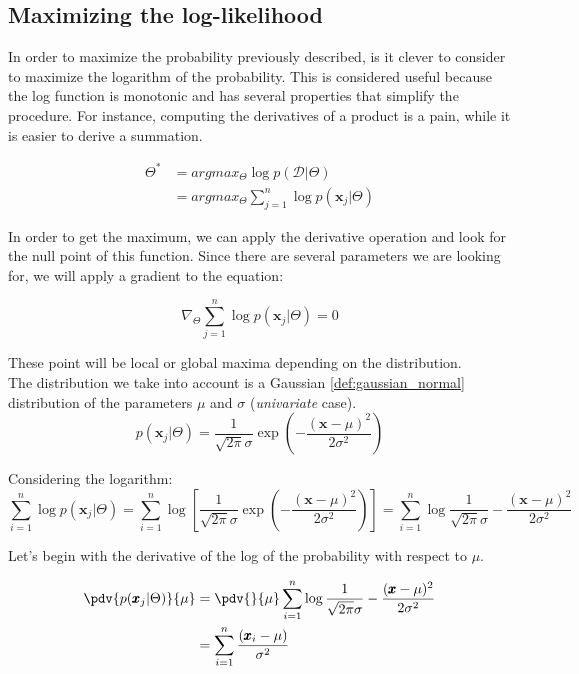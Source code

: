 \subsection{Maximizing the log-likelihood}
In order to maximize the probability previously described, is it clever to consider
to maximize the logarithm of the probability. This is considered useful because
the log function is monotonic and has several properties that simplify the
procedure. For instance, computing the derivatives of a product is a pain, while
it is easier to derive a summation.

\begin{align*}
	\Theta^{*} & = argmax_{\Theta}\log p(\mathcal{D}| \Theta)              \\
	           & = argmax_{\Theta}\sum_{j=1}^{n}\log p(\pmb{x}_{j}|\Theta)
\end{align*}

In order to get the maximum, we can apply the derivative operation and look for the
null point of this function. Since there are several parameters we are looking
for, we will apply a gradient to the equation:

\begin{equation}
	\nabla_{\Theta}\sum_{j=1}^{n}\log p(\pmb{x}_{j}|\Theta) = 0
\end{equation}

These point will be local or global maxima depending on the distribution.\\

The distribution we take into account is a Gaussian \ref{def:gaussian_normal} distribution
of the parameters $\mu$ and $\sigma$ (\textit{univariate} case).
\[
	p(\pmb{x}_{j}|\Theta) = \frac{1}{\sqrt{2\pi}\sigma}\exp{(-\frac{(\pmb{x}-\mu)^{2}}{2\sigma^{2}})}
\]

Considering the logarithm:
\[
	\sum_{i=1}^{n}\log p(\pmb{x}_{j}|\Theta) = \sum_{i=1}^{n}\log{ \left[ \frac{1}{\sqrt{2\pi}\sigma} \exp{(-\frac{(\pmb{x}-\mu)^{2}}{2\sigma^{2}})} \right] }
	= \sum_{i=1}^{n}\log{ \frac{1}{\sqrt{2\pi}\sigma}}-\frac{(\pmb{x}-\mu)^{2}}{2\sigma^{2}}
\]

Let's begin with the derivative of the log of the probability with respect to
$\mu$.

\begin{align*}
	\pdv{p(\pmb{x}_j|\Theta)}{\mu} & = \pdv{}{\mu}\sum_{i=1}^{n}\log \frac{1}{\sqrt{2\pi}\sigma}- \frac{(\pmb{x}-\mu)^{2}}{2\sigma^{2}} \\
	                               & = \sum_{i=1}^{n}\frac{(\pmb{x}_{i}- \mu)}{\sigma^{2}}
\end{align*}

